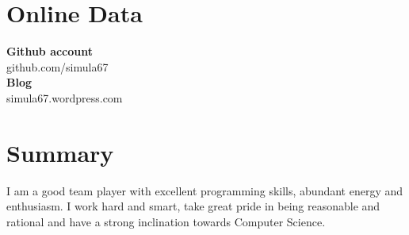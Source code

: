 \documentclass[line,margin]{res}
\begin{document}
\begin{resume}
\section{Online Data}
{\bf Github account}\\
github.com/simula67\\
{\bf Blog}\\
simula67.wordpress.com

\section{Summary}
I am a good team player with excellent programming skills, abundant energy and enthusiasm. I work hard and smart, take great pride in being reasonable and rational and have a strong inclination towards Computer Science.

\end{resume}
\end{document}
